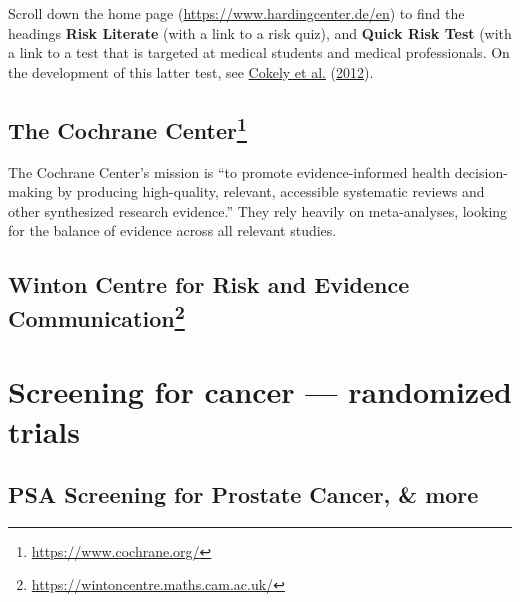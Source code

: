 \documentclass[
  10pt,
  b5paper]{book}
\begin{document}
Scroll down the home page (\url{https://www.hardingcenter.de/en}) to find the
headings \textbf{Risk Literate} (with a link to a risk quiz), and
\textbf{Quick Risk Test} (with a link to a test that is targeted at medical
students and medical professionals. On the development of this latter
test, see \protect\hyperlink{ref-cokely2012measuring}{Cokely et al.} (\protect\hyperlink{ref-cokely2012measuring}{2012}).

\hypertarget{the-cochrane-center}{%
\subsection*{\texorpdfstring{The Cochrane Center\footnote{\url{https://www.cochrane.org/}}}{The Cochrane Center}}\label{the-cochrane-center}}

The Cochrane Center's mission is ``to promote evidence-informed health decision-making by producing high-quality, relevant, accessible systematic
reviews and other synthesized research evidence.'' They rely heavily on
meta-analyses, looking for the balance of evidence across all relevant
studies.

\hypertarget{winton-centre-for-risk-and-evidence-communication}{%
\subsection*{\texorpdfstring{Winton Centre for Risk and Evidence Communication\footnote{\url{https://wintoncentre.maths.cam.ac.uk/}}}{Winton Centre for Risk and Evidence Communication}}\label{winton-centre-for-risk-and-evidence-communication}}

\hypertarget{screening-for-cancer-randomized-trials}{%
\section{Screening for cancer --- randomized trials}\label{screening-for-cancer-randomized-trials}}

\hypertarget{psa-screening-for-prostate-cancer-more}{%
\subsection*{PSA Screening for Prostate Cancer, \& more}\label{psa-screening-for-prostate-cancer-more}}
\end{document}
